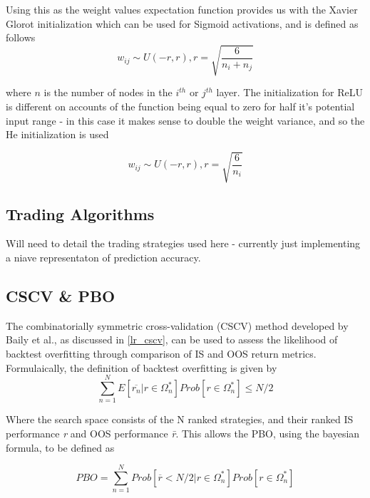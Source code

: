 \documentclass[a4paper,latin]{paper}
\begin{document}
Using this as the weight values expectation function provides us with the Xavier Glorot initialization  which can be used for Sigmoid activations, and is defined as follows
\begin{equation}
w_{ij} \sim U(-r, r), r = \sqrt{\frac{6}{n_i + n_j}}
\end{equation}

where $n$ is the number of nodes in the $i^{th}$ or $j^{th}$ layer.
\newline\newline
The initialization for ReLU is different on accounts of the function being equal to zero for half it's potential input range - in this case it makes sense to double the weight variance, and so the He  initialization is used

\begin{equation}
w_{ij} \sim U(-r, r), r = \sqrt{\frac{6}{n_i}}
\end{equation}


\subsection{Trading Algorithms}\label{imp_tradingstrat}

Will need to detail the trading strategies  used here - currently just implementing  a niave representaton of prediction accuracy. \todo{}

\subsection{CSCV \& PBO}\label{imp_cscv}

The  combinatorially symmetric cross-validation (CSCV) method developed by Baily et al., as discussed in \ref{lr_cscv}, can be used to assess the likelihood of backtest overfitting through comparison of IS and OOS return metrics. Formulaically, the definition of backtest overfitting is given by
\begin{equation}\label{eq:PBO1}
\sum_{n=1}^{N}E[\overline{r_n}|r\in 
\Omega_{n}^{*}]Prob[r\in\Omega_{n}^{*}]\leq{N/2}
\end{equation}

Where the search space {\textOmega} consists of the N ranked strategies, and their ranked IS performance \textit{r} and OOS performance
\textit{\={r}}. This allows the PBO, using the bayesian formula, to be defined as 

\begin{equation}\label{eq:PBO2}
PBO = \sum_{n=1}^{N}Prob[\overline{r} < {N/2}|r\in\Omega_{n}^{*}]Prob[r\in\Omega_{n}^{*}]
\end{equation}
\end{document}
